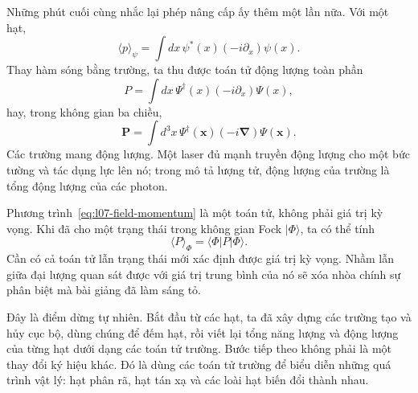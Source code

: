 Những phút cuối cùng nhắc lại phép nâng cấp ấy thêm một lần nữa. Với một hạt,
\begin{equation}
\langle p\rangle_\psi
=\int dx\,\psi^*(x)\left(-i\partial_x\right)\psi(x).
\label{eq:l07-one-particle-momentum}
\end{equation}
Thay hàm sóng bằng trường, ta thu được toán tử động lượng toàn phần
\begin{equation}
P=\int dx\,\Psi^\dagger(x)\left(-i\partial_x\right)\Psi(x),
\label{eq:l07-field-momentum}
\end{equation}
hay, trong không gian ba chiều,
\begin{equation}
\mathbf P=\int d^3x\,\Psi^\dagger(\mathbf x)
\left(-i\boldsymbol\nabla\right)\Psi(\mathbf x).
\end{equation}
Các trường mang động lượng. Một laser đủ mạnh truyền động lượng cho một bức tường và tác dụng lực lên nó; trong mô tả lượng tử, động lượng của trường là tổng động lượng của các photon.

Phương trình~\eqref{eq:l07-field-momentum} là một toán tử, không phải giá trị kỳ vọng. Khi đã cho một trạng thái trong không gian Fock \(|\Phi\rangle\), ta có thể tính
\begin{equation}
\langle P\rangle_\Phi=\langle\Phi|P|\Phi\rangle.
\end{equation}
Cần có cả toán tử lẫn trạng thái mới xác định được giá trị kỳ vọng. Nhầm lẫn giữa đại lượng quan sát được với giá trị trung bình của nó sẽ xóa nhòa chính sự phân biệt mà bài giảng đã làm sáng tỏ.

\begin{classroomqa}
\end{classroomqa}

Đây là điểm dừng tự nhiên. Bắt đầu từ các hạt, ta đã xây dựng các trường tạo và hủy cục bộ, dùng chúng để đếm hạt, rồi viết lại tổng năng lượng và động lượng của từng hạt dưới dạng các toán tử trường. Bước tiếp theo không phải là một thay đổi ký hiệu khác. Đó là dùng các toán tử trường để biểu diễn những quá trình vật lý: hạt phân rã, hạt tán xạ và các loài hạt biến đổi thành nhau.